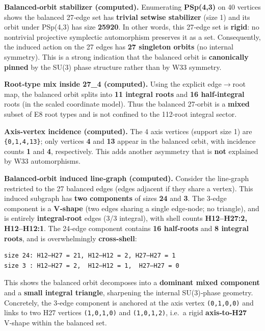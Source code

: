 \documentclass[11pt]{article}
\begin{document}
\textbf{Balanced‑orbit stabilizer (computed).} Enumerating
\textbf{PSp(4,3)} on 40 vertices shows the balanced 27‑edge set has
\textbf{trivial setwise stabilizer} (size 1) and its orbit under
PSp(4,3) has size \textbf{25920}. In other words, this 27‑edge set is
\textbf{rigid}: no nontrivial projective symplectic automorphism
preserves it as a set. Consequently, the induced action on the 27 edges
has \textbf{27 singleton orbits} (no internal symmetry). This is a
strong indication that the balanced orbit is \textbf{canonically pinned}
by the SU(3) phase structure rather than by W33 symmetry.

\textbf{Root‑type mix inside 27\_4 (computed).} Using the explicit
edge\ensuremath{\rightarrow}root map, the balanced orbit splits into
\textbf{11 integral roots} and \textbf{16 half‑integral} roots (in the
scaled coordinate model). Thus the balanced 27‑orbit is a \textbf{mixed}
subset of E8 root types and is not confined to the 112‑root integral
sector.

\textbf{Axis‑vertex incidence (computed).} The 4 axis vertices (support
size 1) are \texttt{\{0,1,4,13\}}; only vertices \textbf{4} and
\textbf{13} appear in the balanced orbit, with incidence counts
\textbf{1} and \textbf{4}, respectively. This adds another asymmetry
that is \textbf{not} explained by W33 automorphisms.

\textbf{Balanced‑orbit induced line‑graph (computed).} Consider the
line‑graph restricted to the 27 balanced edges (edges adjacent if they
share a vertex). This induced subgraph has \textbf{two components} of
sizes \textbf{24} and \textbf{3}. The 3‑edge component is a
\textbf{V‑shape} (two edges sharing a single edge‑node; no triangle),
and is entirely \textbf{integral‑root} edges (3/3 integral), with shell
counts \textbf{H12--H27:2, H12--H12:1}. The 24‑edge component contains
\textbf{16 half‑roots} and \textbf{8 integral roots}, and is
overwhelmingly \textbf{cross‑shell}:

\begin{verbatim}
size 24: H12–H27 = 21, H12–H12 = 2, H27–H27 = 1
size 3 : H12–H27 = 2,  H12–H12 = 1,  H27–H27 = 0
\end{verbatim}

This shows the balanced orbit decomposes into a \textbf{dominant mixed
component} and a \textbf{small integral triangle}, sharpening the
internal SU(3)‑phase geometry. Concretely, the 3‑edge component is
anchored at the axis vertex \texttt{(0,1,0,0)} and links to two H27
vertices \texttt{(1,0,1,0)} and \texttt{(1,0,1,2)}, i.e.~a rigid
\textbf{axis‑to‑H27} V‑shape within the balanced set.
\end{document}
